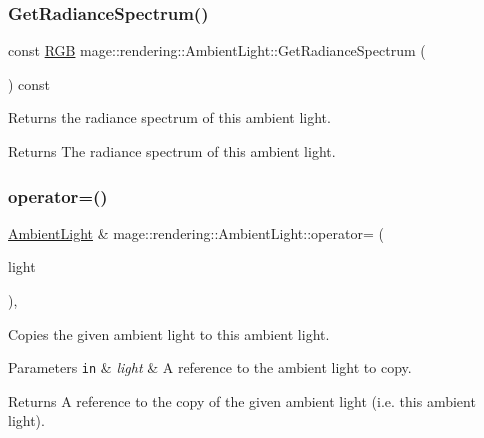 \subsubsection{\texorpdfstring{Get\+Radiance\+Spectrum()}{GetRadianceSpectrum()}}
{\footnotesize\ttfamily const \mbox{\hyperlink{structmage_1_1_r_g_b}{R\+GB}} mage\+::rendering\+::\+Ambient\+Light\+::\+Get\+Radiance\+Spectrum (\begin{DoxyParamCaption}{ }\end{DoxyParamCaption}) const\hspace{0.3cm}{\ttfamily [noexcept]}}

Returns the radiance spectrum of this ambient light.

\begin{DoxyReturn}{Returns}
The radiance spectrum of this ambient light. 
\end{DoxyReturn}
\mbox{\label{classmage_1_1rendering_1_1_ambient_light_a351cdcd2e1b25c6a44356060f0e61c2b}} 
\subsubsection{\texorpdfstring{operator=()}{operator=()}\hspace{0.1cm}{\footnotesize\ttfamily [1/2]}}
{\footnotesize\ttfamily \mbox{\hyperlink{classmage_1_1rendering_1_1_ambient_light}{Ambient\+Light}} \& mage\+::rendering\+::\+Ambient\+Light\+::operator= (\begin{DoxyParamCaption}\item[{const \mbox{\hyperlink{classmage_1_1rendering_1_1_ambient_light}{Ambient\+Light}} \&}]{light }\end{DoxyParamCaption})\hspace{0.3cm}{\ttfamily [default]}, {\ttfamily [noexcept]}}

Copies the given ambient light to this ambient light.


\begin{DoxyParams}[1]{Parameters}
\mbox{\tt in}  & {\em light} & A reference to the ambient light to copy. \\
\hline
\end{DoxyParams}
\begin{DoxyReturn}{Returns}
A reference to the copy of the given ambient light (i.\+e. this ambient light). 
\end{DoxyReturn}
\mbox{\label{classmage_1_1rendering_1_1_ambient_light_aa571cc046cb35ceafba6cb0a2ec4bd6c}} 
